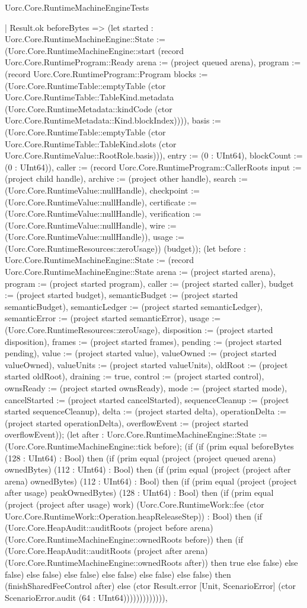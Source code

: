 \begin{lexlean}{Uorc.Core.RuntimeMachineEngineTests}
\begin{semanticmodule}
{              | Result.ok beforeBytes => (let started : Uorc.Core.RuntimeMachineEngine::State := (Uorc.Core.RuntimeMachineEngine::start (record Uorc.Core.RuntimeProgram::Ready {arena := (project queued arena), program := (record Uorc.Core.RuntimeProgram::Program {blocks := (Uorc.Core.RuntimeTable::emptyTable (ctor Uorc.Core.RuntimeTable::TableKind.metadata (Uorc.Core.RuntimeMetadata::kindCode (ctor Uorc.Core.RuntimeMetadata::Kind.blockIndex)))), basis := (Uorc.Core.RuntimeTable::emptyTable (ctor Uorc.Core.RuntimeTable::TableKind.slots (ctor Uorc.Core.RuntimeValue::RootRole.basis))), entry := (0 : UInt64), blockCount := (0 : UInt64)}), caller := (record Uorc.Core.RuntimeProgram::CallerRoots {input := (project child handle), archive := (project other handle), search := (Uorc.Core.RuntimeValue::nullHandle), checkpoint := (Uorc.Core.RuntimeValue::nullHandle), certificate := (Uorc.Core.RuntimeValue::nullHandle), verification := (Uorc.Core.RuntimeValue::nullHandle), wire := (Uorc.Core.RuntimeValue::nullHandle)}), usage := (Uorc.Core.RuntimeResources::zeroUsage)}) (budget)); (let before : Uorc.Core.RuntimeMachineEngine::State := (record Uorc.Core.RuntimeMachineEngine::State {arena := (project started arena), program := (project started program), caller := (project started caller), budget := (project started budget), semanticBudget := (project started semanticBudget), semanticLedger := (project started semanticLedger), semanticError := (project started semanticError), usage := (Uorc.Core.RuntimeResources::zeroUsage), disposition := (project started disposition), frames := (project started frames), pending := (project started pending), value := (project started value), valueOwned := (project started valueOwned), valueUnits := (project started valueUnits), oldRoot := (project started oldRoot), draining := true, control := (project started control), ownsReady := (project started ownsReady), mode := (project started mode), cancelStarted := (project started cancelStarted), sequenceCleanup := (project started sequenceCleanup), delta := (project started delta), operationDelta := (project started operationDelta), overflowEvent := (project started overflowEvent)}); (let after : Uorc.Core.RuntimeMachineEngine::State := (Uorc.Core.RuntimeMachineEngine::tick before); (if (if (prim equal beforeBytes (128 : UInt64) : Bool) then (if (prim equal (project (project queued arena) ownedBytes) (112 : UInt64) : Bool) then (if (prim equal (project (project after arena) ownedBytes) (112 : UInt64) : Bool) then (if (prim equal (project (project after usage) peakOwnedBytes) (128 : UInt64) : Bool) then (if (prim equal (project (project after usage) work) (Uorc.Core.RuntimeWork::fee (ctor Uorc.Core.RuntimeWork::Operation.heapReleaseStep)) : Bool) then (if (Uorc.Core.HeapAudit::auditRoots (project before arena) (Uorc.Core.RuntimeMachineEngine::ownedRoots before)) then (if (Uorc.Core.HeapAudit::auditRoots (project after arena) (Uorc.Core.RuntimeMachineEngine::ownedRoots after)) then true else false) else false) else false) else false) else false) else false) else false) then (finishSharedFeeControl after) else (ctor Result.error [Unit, ScenarioError] (ctor ScenarioError.audit (64 : UInt64))))))))))))),
}
\end{semanticmodule}
\end{lexlean}
